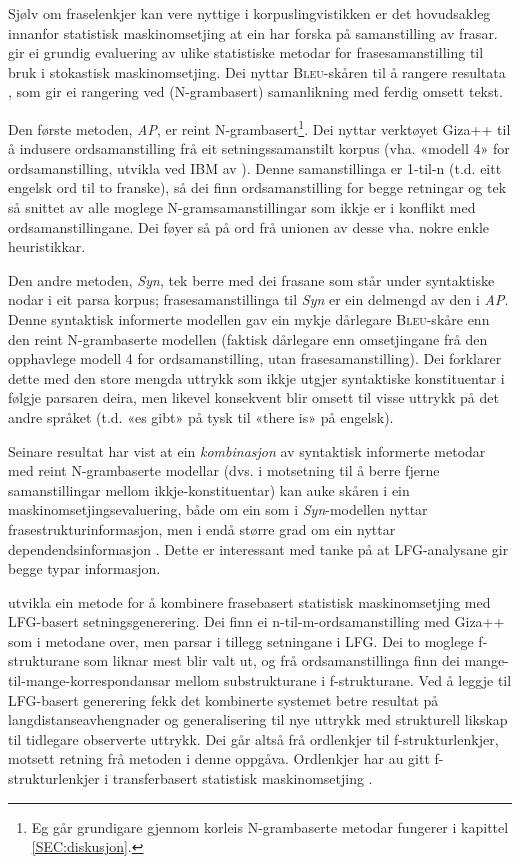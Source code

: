 \documentclass[11pt,a4paper,oneside,draft]{book}
\newcommand{\Bleu}{\textsc{Bleu}}
\begin{document}
Sjølv om fraselenkjer kan vere nyttige i korpuslingvistikken er det
hovudsakleg innanfor statistisk maskinomsetjing at ein har forska på
samanstilling av frasar. \citet{koehn2003spb} gir ei grundig
evaluering av ulike statistiske metodar for frasesamanstilling til
bruk i stokastisk maskinomsetjing. Dei nyttar \Bleu-skåren til å
rangere resultata
\citep[Papineni~et~al.,~2001,~i][s.~51]{koehn2003spb}, som gir ei
rangering ved (N-grambasert) samanlikning med ferdig omsett tekst.

Den første metoden, \emph{AP}, er reint N-grambasert\footnote{Eg går grundigare gjennom korleis N-grambaserte metodar
        fungerer i kapittel \ref{SEC:diskusjon}. }. Dei nyttar
verktøyet Giza++ \citep[Och~og~Ney,~2000,~i][s.~50]{koehn2003spb} til
å indusere ordsamanstilling frå eit setningssamanstilt korpus
(vha. «modell 4» for ordsamanstilling, utvikla ved IBM av
\citet{brown1993msm}). Denne samanstillinga er 1-til-n (t.d. eitt
engelsk ord til to franske), så dei finn ordsamanstilling for begge
retningar og tek så snittet av alle moglege N-gramsamanstillingar som
ikkje er i konflikt med ordsamanstillingane. Dei føyer så på ord frå
unionen av desse vha. nokre enkle heuristikkar.

Den andre metoden, \emph{Syn}, tek berre med dei frasane som står under
syntaktiske nodar i eit parsa korpus; frasesamanstillinga til \emph{Syn} er
ein delmengd av den i \emph{AP}. Denne syntaktisk informerte modellen gav
ein mykje dårlegare \Bleu-skåre enn den reint N-grambaserte modellen
(faktisk dårlegare enn omsetjingane frå den opphavlege modell 4 for
ordsamanstilling, utan frasesamanstilling). Dei forklarer dette med
den store mengda uttrykk som ikkje utgjer syntaktiske konstituentar i
følgje parsaren deira, men likevel konsekvent blir omsett til visse
uttrykk på det andre språket (t.d. «es gibt» på tysk til «there is» på
engelsk). 

Seinare resultat har vist at ein \emph{kombinasjon} av syntaktisk
informerte metodar med reint N-grambaserte modellar (dvs. i motsetning
til å berre fjerne samanstillingar mellom ikkje-konstituentar) kan
auke skåren i ein maskinomsetjingsevaluering, både om ein som i
\emph{Syn}-modellen nyttar frasestrukturinformasjon, men i endå større
grad om ein nyttar dependendsinformasjon
\citep{tinsley2007ept,hearne2008ccd}. Dette er interessant med tanke
på at LFG-analysane gir begge typar informasjon.

\citet{riezler2006gmt} utvikla ein metode for å kombinere frasebasert
statistisk maskinomsetjing med LFG-basert setningsgenerering. Dei finn
ei n-til-m-ordsamanstilling med Giza++ som i metodane over, men parsar
i tillegg setningane i LFG. Dei to moglege f-strukturane som liknar
mest blir valt ut, og frå ordsamanstillinga finn dei
mange-til-mange-korrespondansar mellom substrukturane i
f-strukturane. Ved å leggje til LFG-basert generering fekk det
kombinerte systemet betre resultat på langdistanseavhengnader og
generalisering til nye uttrykk med strukturell likskap til tidlegare
observerte uttrykk. Dei går altså frå ordlenkjer til
f-strukturlenkjer, motsett retning frå metoden i denne
oppgåva. Ordlenkjer har au gitt f-strukturlenkjer i transferbasert
statistisk maskinomsetjing
\citep{graham2010dsl,graham2009osr,graham2009fts}.
\end{document}
